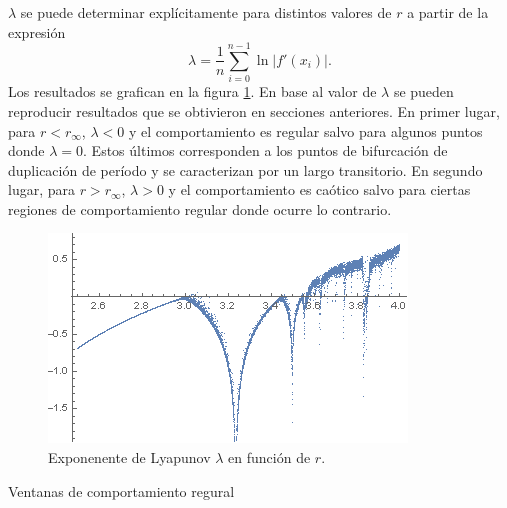 \documentclass[aps,prb,twocolumn,superscriptaddress,floatfix,longbibliography]{revtex4-2}
\newcounter{para}
\begin{document}
$\lambda$ se puede determinar explícitamente para distintos valores de $r$ a partir de la expresión
\[\lambda = \frac{1}{n} \sum_{i = 0}^{n-1}\ln{|f'(x_i)|}.\]
Los resultados se grafican en la figura \ref{fig:d.lambda}. En base al valor de $\lambda$ se pueden reproducir resultados que se obtivieron en secciones anteriores. En primer lugar, para $r < r_\infty$, $\lambda < 0$ y el comportamiento es regular salvo para algunos puntos donde $\lambda = 0$. Estos últimos corresponden a los puntos de bifurcación de duplicación de período y se caracterizan por un largo transitorio. En segundo lugar, para $r > r_\infty$, $\lambda > 0$ y el comportamiento es caótico salvo para ciertas regiones de comportamiento regular donde ocurre lo contrario.

\begin{figure}[htp]
    \includegraphics[clip=true,width=0.7\columnwidth]{d.lambda.png}
    \caption{Exponenente de Lyapunov $\lambda$ en función de $r$.}
     \label{fig:d.lambda}
\end{figure}


Ventanas de comportamiento regural



\end{document}
